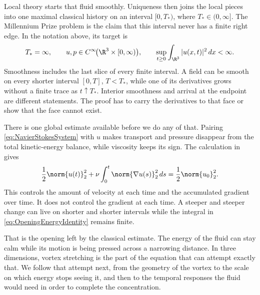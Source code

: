 Local theory starts that fluid smoothly.  Uniqueness then joins the local
pieces into one maximal classical history on an interval \([0,T_*)\), where
\(T_*\in(0,\infty]\).  The Millennium Prize problem is the claim that this
interval never has a finite right edge.  In the notation above, its target is
\begin{equation}\label{eq:WholeSpaceRegularityTarget}
  T_*=\infty,
  \qquad
  u,p\in C^\infty\!\bigl(\R^3\times[0,\infty)\bigr),
  \qquad
  \sup_{t\geq0}\int_{\R^3}|u(x,t)|^2\,dx<\infty.
\end{equation}
Smoothness includes the last slice of every finite interval.  A field can be
smooth on every shorter interval \([0,T]\), \(T<T_*\), while one of its
derivatives grows without a finite trace as \(t\uparrow T_*\).  Interior
smoothness and arrival at the endpoint are different statements.  The proof
has to carry the derivatives to that face or show that the face cannot exist.

There is one global estimate available before we do any of that.  Pairing
\eqref{eq:NavierStokesSystem} with \(u\) makes transport and pressure disappear
from the total kinetic-energy balance, while viscosity keeps its sign.  The
calculation in  gives
\begin{equation}\label{eq:OpeningEnergyIdentity}
  \frac12\norm{u(t)}_2^2
  +\nu\int_0^t\norm{\nabla u(s)}_2^2\,ds
  =\frac12\norm{u_0}_2^2.
\end{equation}
This controls the amount of velocity at each time and the accumulated gradient
over time.  It does not control the gradient at each time.  A steeper and
steeper change can live on shorter and shorter intervals while the integral in
\eqref{eq:OpeningEnergyIdentity} remains finite.

That is the opening left by the classical estimate.  The energy of the fluid
can stay calm while its motion is being pressed across a narrowing distance.
In three dimensions, vortex stretching is the part of the equation that can
attempt exactly that.  We follow that attempt next, from the geometry of the
vortex to the scale on which energy stops seeing it, and then to the temporal
responses the fluid would need in order to complete the concentration.
